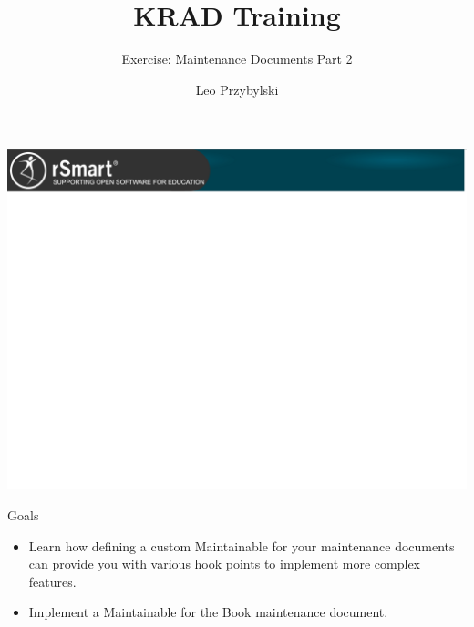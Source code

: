 \documentclass[xcolor=dvipsnames,14pt,professionalfonts]{beamer}
\begin{document}
\title{KRAD Training}
\subtitle{Exercise: Maintenance Documents Part 2}
\author[Leo]{Leo Przybylski}

\usebackgroundtemplate%
{%
    \includegraphics[width=\paperwidth,height=\paperheight]{../img/header.png}%
}

{
%
\begin{frame}[plain]
  \titlepage
\end{frame}
}

\begin{frame}{Goals}
  \begin{itemize}
 \item Learn how defining a custom Maintainable for your maintenance documents can provide you with various hook points to implement more complex features.
 \item Implement a Maintainable for the Book maintenance document.
\end{itemize}
\end{frame}
\end{document}
